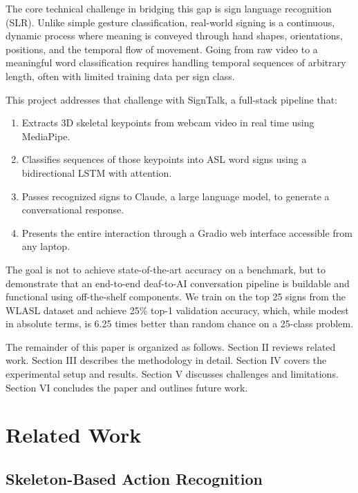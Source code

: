 \documentclass[conference]{IEEEtran}
\begin{document}
The core technical challenge in bridging this gap is sign language recognition (SLR). Unlike simple gesture classification, real-world signing is a continuous, dynamic process where meaning is conveyed through hand shapes, orientations, positions, and the temporal flow of movement. Going from raw video to a meaningful word classification requires handling temporal sequences of arbitrary length, often with limited training data per sign class.

This project addresses that challenge with SignTalk, a full-stack pipeline that:
\begin{enumerate}
    \item Extracts 3D skeletal keypoints from webcam video in real time using MediaPipe.
    \item Classifies sequences of those keypoints into ASL word signs using a bidirectional LSTM with attention.
    \item Passes recognized signs to Claude, a large language model, to generate a conversational response.
    \item Presents the entire interaction through a Gradio web interface accessible from any laptop.
\end{enumerate}

The goal is not to achieve state-of-the-art accuracy on a benchmark, but to demonstrate that an end-to-end deaf-to-AI conversation pipeline is buildable and functional using off-the-shelf components. We train on the top 25 signs from the WLASL dataset \cite{li2020wlasl} and achieve 25\% top-1 validation accuracy, which, while modest in absolute terms, is 6.25 times better than random chance on a 25-class problem.

The remainder of this paper is organized as follows. Section II reviews related work. Section III describes the methodology in detail. Section IV covers the experimental setup and results. Section V discusses challenges and limitations. Section VI concludes the paper and outlines future work.

\section{Related Work}

\subsection{Skeleton-Based Action Recognition}
\end{document}
